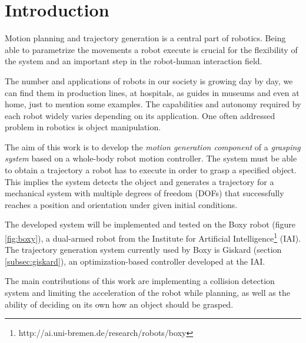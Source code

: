 

\chapter{\textbf{Introduction}}

Motion planning and trajectory generation is a central part of robotics. Being able to parametrize the movements a robot execute is crucial for the flexibility of the system and an important step in the robot-human interaction field.

The number and applications of robots in our society is growing day by day, we can find them in production lines, at hospitals, as guides in museums and even at home, just to mention some examples. The capabilities and autonomy required by each robot widely varies depending on its application. One often addressed problem in robotics is object manipulation.

The aim of this work is to develop the \textit{motion generation component} of a \textit{grasping system} based on a whole-body robot motion controller. The system must be able to obtain a trajectory a robot has to execute in order to grasp a specified object. This implies the system detects the object and generates a trajectory for a mechanical system with multiple degrees of freedom (DOFs) that successfully reaches a position and orientation under given initial conditions.

The developed system will be implemented and tested on the Boxy robot (figure \ref{fig:boxy}), a dual-armed robot from the Institute for Artificial Intelligence\footnote{http://ai.uni-bremen.de/research/robots/boxy} (IAI). The trajectory generation system currently used by Boxy is Giskard (section \ref{subsec:giskard}), an optimization-based controller developed at the IAI. 

The main contributions of this work are implementing a collision detection system and limiting the acceleration of the robot while planning, as well as the ability of deciding on its own how an object should be grasped.


